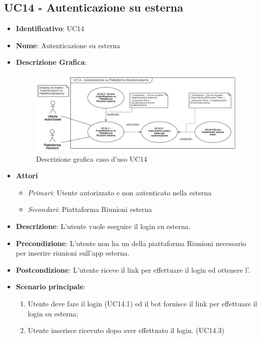 \subsection{UC14 - Autenticazione su  esterna}
\begin{itemize}
	\item \textbf{Identificativo}: UC14
	\item \textbf{Nome}: Autenticazione su  esterna
	\item\textbf{Descrizione Grafica}: 
	\begin{figure}[h]
		\centering
		\includegraphics[scale=0.60]{images/UC14.png} 
		\caption{Descrizione grafica caso d'uso UC14}
	 \end{figure}

	\item \textbf{Attori}
	\begin{itemize} 
		\item \textit{Primari}: Utente autorizzato e non autenticato nella  esterna
		\item \textit{Secondari}: Piattaforma Riunioni esterna
	\end{itemize}
	\item \textbf{Descrizione}: L'utente vuole eseguire il login su  esterna.
	\item \textbf{Precondizione}: L'utente non ha un  della piattaforma Riunioni necessario per inserire riunioni sull'app esterna.
	\item \textbf{Postcondizione}: L'utente riceve il link per effettuare il login ed ottenere l'.
	\item \textbf{Scenario principale}: \begin{enumerate}
		\item Utente deve fare il login (UC14.1) ed il bot fornisce il link per effettuare il login su  esterna; 
		\item Utente inserisce  ricevuto dopo aver effettuato il login. (UC14.3)
	\end{enumerate}
\end{itemize}

